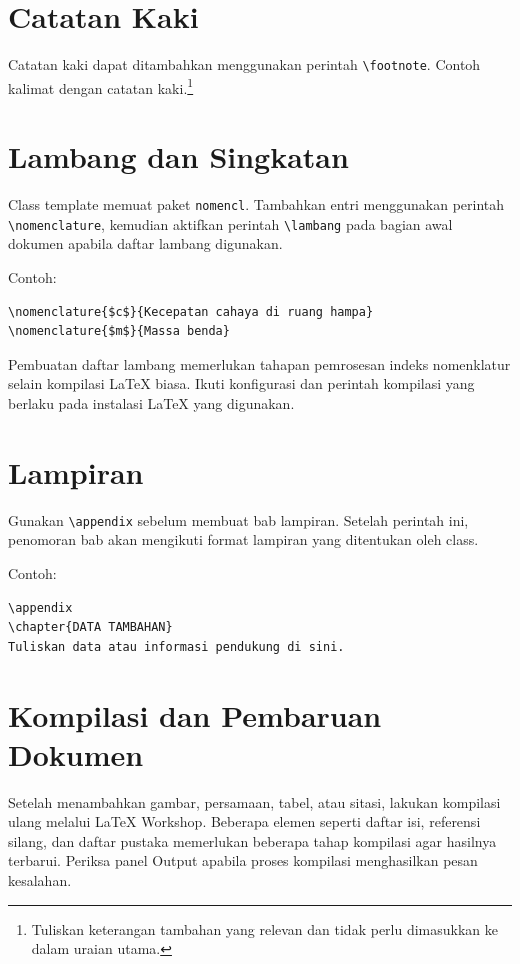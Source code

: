 \documentclass[skripsi]{ugmskripsi}
\begin{document}
\section{Catatan Kaki}
Catatan kaki dapat ditambahkan menggunakan perintah \verb|\footnote|.
Contoh kalimat dengan catatan kaki.\footnote{Tuliskan keterangan tambahan
yang relevan dan tidak perlu dimasukkan ke dalam uraian utama.}

\section{Lambang dan Singkatan}
Class template memuat paket \texttt{nomencl}. Tambahkan entri menggunakan
perintah \verb|\nomenclature|, kemudian aktifkan perintah \verb|\lambang|
pada bagian awal dokumen apabila daftar lambang digunakan.

Contoh:
\begin{verbatim}
\nomenclature{$c$}{Kecepatan cahaya di ruang hampa}
\nomenclature{$m$}{Massa benda}
\end{verbatim}

Pembuatan daftar lambang memerlukan tahapan pemrosesan indeks nomenklatur
selain kompilasi LaTeX biasa. Ikuti konfigurasi dan perintah kompilasi yang
berlaku pada instalasi LaTeX yang digunakan.

\section{Lampiran}
Gunakan \verb|\appendix| sebelum membuat bab lampiran. Setelah perintah ini,
penomoran bab akan mengikuti format lampiran yang ditentukan oleh class.

Contoh:
\begin{verbatim}
\appendix
\chapter{DATA TAMBAHAN}
Tuliskan data atau informasi pendukung di sini.
\end{verbatim}

\section{Kompilasi dan Pembaruan Dokumen}
Setelah menambahkan gambar, persamaan, tabel, atau sitasi, lakukan kompilasi
ulang melalui LaTeX Workshop. Beberapa elemen seperti daftar isi, referensi
silang, dan daftar pustaka memerlukan beberapa tahap kompilasi agar hasilnya
terbarui. Periksa panel Output apabila proses kompilasi menghasilkan pesan
kesalahan.
\fi
\end{document}

